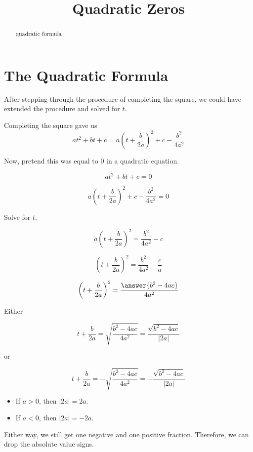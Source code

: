 \documentclass{ximera}
\title{Quadratic Zeros}
\begin{document}
\begin{abstract}
quadratic formula
\end{abstract}
\maketitle







\section{The Quadratic Formula}


After stepping through the procedure of completing the square, we could have extended the procedure and solved for $t$.


Completing the square gave us 
\[ a t^2 + b t + c = a \left(t + \frac{b}{2 a} \right)^2 + c - \frac{b^2}{4 a^2} \]


Now, pretend this was equal to $0$ in a quadratic equation.


\[ a t^2 + b t + c = 0 \]

\[ a\left(t + \frac{b}{2 a}\right)^2 + c - \frac{b^2}{4 a^2}  = 0\]

Solve for $t$.


\[ a \left(t + \frac{b}{2 a} \right)^2  = \frac{b^2}{4 a^2} - c\]

\[ \left(t + \frac{b}{2 a} \right)^2  = \frac{b^2}{4 a^2} - \frac{c}{a}\]

\[ \left(t + \frac{b}{2 a} \right)^2  = \frac{\answer{b^2 - 4 a c}}{4 a^2} \]



Either 


\[ t + \frac{b}{2 a}  = \sqrt{\frac{b^2 - 4 a c}{4 a^2}}  = \frac{\sqrt{b^2 - 4 a c}}{| 2a |}   \]

or


\[ t + \frac{b}{2 a}  = -\sqrt{\frac{b^2 - 4 a c}{4 a^2}} = -\frac{\sqrt{b^2 - 4 a c}}{| 2a |}    \]



\begin{itemize}
\item If $a > 0$, then $| 2a | = 2a$.
\item If $a < 0$, then $| 2a | = -2a$.
\end{itemize}

Either way, we still get one negative and one positive fraction.  Therefore, we can drop the absolute value signs.  
\end{document}
